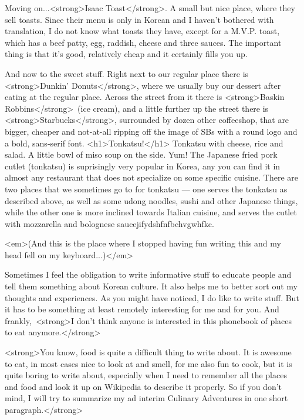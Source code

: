 \begin{post}
\begin{content}
Moving on...<strong>Isaac Toast</strong>. A small but nice place, where they sell toasts. Since their menu is only in Korean and I haven't bothered with translation, I do not know what toasts they have, except for a M.V.P. toast, which has a beef patty, egg, raddish, cheese and three sauces. The important thing is that it's good, relatively cheap and it certainly fills you up.

And now to the sweet stuff. Right next to our regular place there is <strong>Dunkin' Donuts</strong>, where we usually buy our dessert after eating at the regular place. Across the street from it there is <strong>Baskin Robbins</strong> (ice cream), and a little further up the street there is <strong>Starbucks</strong>, surrounded by dozen other coffeeshop, that are bigger, cheaper and not-at-all ripping off the image of SBs with a round logo and a bold, sans-serif font.
<h1>Tonkatsu!</h1>
Tonkatsu with cheese, rice and salad. A little bowl of miso soup on the side. Yum! The Japanese fried pork cutlet (tonkatsu) is suprisingly very popular in Korea, any you can find it in almost any restaurant that does not specialize on some specific cuisine. There are two places that we sometimes go to for tonkatsu — one serves the tonkatsu as described above, as well as some udong noodles, sushi and other Japanese things, while the other one is more inclined towards Italian cuisine, and serves the cutlet with mozzarella and bolognese saucejifydshfnfbchvgwhfkc.

<em>(And this is the place where I stopped having fun writing this and my head fell on my keyboard...)</em>

Sometimes I feel the obligation to write informative stuff to educate people and tell them something about Korean culture. It also helps me to better sort out my thoughts and experiences. As you might have noticed, I do like to write stuff. But it has to be something at least remotely interesting for me and for you. And frankly, <strong>I don't think anyone is interested in this phonebook of places to eat anymore.</strong>

<strong>You know, food is quite a difficult thing to write about. It is awesome to eat, in most cases nice to look at and smell, for me also fun to cook, but it is quite boring to write about, especially when I need to remember all the places and food and look it up on Wikipedia to describe it properly. So if you don't mind, I will try to summarize my ad interim Culinary Adventures in one short paragraph.</strong>


\end{content}
\end{post}
